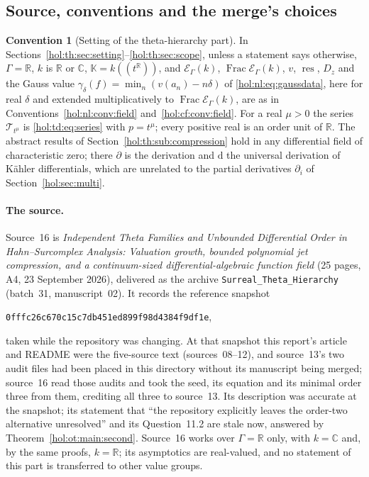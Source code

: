 \documentclass[11pt]{article}
\numberwithin{equation}{section}
\theoremstyle{definition}
\newtheorem{convention}[theorem]{Convention}
\theoremstyle{remark}
\newcommand{\C}{\mathbb C}
\newcommand{\R}{\mathbb R}
\newcommand{\res}{\operatorname{res}}
\newcommand{\KK}{\mathbb K}
\newcommand{\EK}{\mathcal E_\Gamma(k)}
\newcommand{\FE}{\operatorname{Frac}\EK}
\begin{document}
\subsection{Source, conventions and the merge's choices}
\label{hol:th:sub:conventions}

\begin{convention}[Setting of the theta-hierarchy part]
\label{hol:th:conv:field}
In Sections~\ref{hol:th:sec:setting}--\ref{hol:th:sec:scope}, unless a
statement says otherwise, $\Gamma=\R$, $k$ is $\R$ or $\C$, $\KK=k((t^\R))$,
and $\EK$, $\FE$, $v$, $\res$, $D_z$ and the Gauss value
$\gamma_\delta(f)=\min_n(v(a_n)-n\delta)$ of \eqref{hol:nl:eq:gaussdata}, here
for real $\delta$ and extended multiplicatively to $\FE$, are as in
Conventions~\ref{hol:nl:conv:field} and~\ref{hol:cf:conv:field}. For a real
$\mu>0$ the series $\mathcal T_{t^\mu}$ is \eqref{hol:td:eq:series} with $p=t^\mu$;
every positive real is an order unit of $\R$. The abstract results of
Section~\ref{hol:th:sub:compression} hold in any differential field of
characteristic zero; there $\partial$ is the derivation and $\mathrm d$ the
universal derivation of K\"ahler differentials, which are unrelated to the
partial derivatives $\partial_i$ of Section~\ref{hol:sec:multi}.
\end{convention}

\paragraph{The source.}
Source~16 is \emph{Independent Theta Families and Unbounded Differential Order
in Hahn--Surcomplex Analysis: Valuation growth, bounded polynomial jet
compression, and a continuum-sized differential-algebraic function field}
(25 pages, A4, 23 September 2026), delivered as the archive
\texttt{Surreal\_Theta\_Hierarchy} (batch~31, manuscript~02). It records the
reference snapshot
\begin{center}\small\texttt{0fffc26c670c15c7db451ed899f98d4384f9df1e},\end{center}
taken while the repository was changing. At that snapshot this report's
article and README were the five-source text (sources~08--12), and source~13's
two audit files had been placed in this directory without its manuscript being
merged; source~16 read those audits and took the seed, its equation and its
minimal order three from them, crediting all three to source~13. Its
description was accurate at the snapshot; its statement that ``the repository
explicitly leaves the order-two alternative unresolved'' and its Question~11.2
are stale now, answered by Theorem~\ref{hol:ot:main:second}. Source~16 works
over $\Gamma=\R$ only, with $k=\C$ and, by the same proofs, $k=\R$; its
asymptotics are real-valued, and no statement of this part is transferred to
other value groups.
\end{document}
